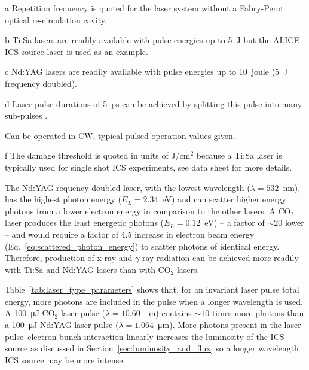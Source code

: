 \documentclass[../main.tex]{subfiles}
\begin{document}
\begin{table}[!h]
{\begin{threeparttable}
\begin{tablenotes}
\item[a]{Repetition frequency is quoted for the laser system without a Fabry-Perot optical re-circulation cavity.}
\item[b]{Ti:Sa lasers are readily available with pulse energies up to 5~\si{\joule} but the ALICE ICS source laser \cite{priebe2008inverse} is used as an example.}
\item[c]{Nd:YAG lasers are readily available with pulse energies up to 10~\si{joule} \cite{ekspla2021ndyag} (5~\si{\joule} frequency doubled).}
\item[d]{Laser pulse durations of 5~\si{\pico\second} can be achieved by splitting this pulse into many sub-pulses \cite{pogorelsky2020converting}.}
\item{Can be operated in CW, typical pulsed operation values given.}
\item[f]{The damage threshold is quoted in units of \si{\joule}/\si{\centi\meter}$^{2}$ because a Ti:Sa laser is typically used for single shot ICS experiments, see data sheet \cite{thorlabs2021tisaoptics} for more details.}
\end{tablenotes}
\end{threeparttable}}
\label{tab:laser_type_parameters}
\end{table}

The Nd:YAG requency doubled laser, with the lowest wavelength ($\lambda=532$~\si{\nano\meter}), has the highest photon energy ($E_{L} = 2.34$~\si{\electronvolt}) and can scatter higher energy photons from a lower electron energy in comparison to the other lasers. A CO$_{2}$ laser produces the least energetic photons ($E_{L} = 0.12$~\si{\electronvolt}) -- a factor of $\sim20$ lower -- and would require a factor of 4.5 increase in electron beam energy (Eq.~\ref{eq:scattered_photon_energy}) to scatter photons of identical energy. Therefore, production of x-ray and $\gamma$-ray radiation can be achieved more readily with Ti:Sa and Nd:YAG lasers than with CO$_{2}$ lasers.

Table~\ref{tab:laser_type_parameters} shows that, for an invariant laser pulse total energy, more photons are included in the pulse when a longer wavelength is used. A 100~\si{\micro\joule} CO$_{2}$ laser pulse ($\lambda = 10.60$~\si{\mico\meter}) contains $\sim10$ times more photons than a 100~\si{\micro\joule} Nd:YAG laser pulse ($\lambda = 1.064$~\si{\micro\meter}). More photons present in the laser pulse--electron bunch interaction linearly increases the luminosity of the ICS source as discussed in Section~\ref{sec:luminosity_and_flux} so a longer wavelength ICS source may be more intense.
\end{document}
